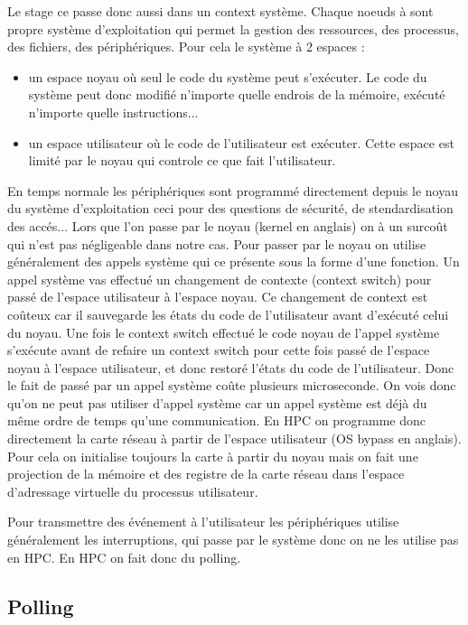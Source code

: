 Le stage ce passe donc aussi dans un context système.
Chaque noeuds à sont propre système d'exploitation qui permet la gestion des ressources, des processus, des fichiers, des périphériques.
Pour cela le système à 2 espaces :
\begin{itemize}
  \item un espace noyau où seul le code du système peut s'exécuter. Le code du système peut donc modifié n'importe quelle endrois de la mémoire, exécuté n'importe quelle instructions...
  \item un espace utilisateur où le code de l'utilisateur est exécuter. Cette espace est limité par le noyau qui controle ce que fait l'utilisateur.
\end{itemize}

En temps normale les périphériques sont programmé directement depuis le noyau du système d'exploitation ceci pour des questions de sécurité, de stendardisation des accés...
Lors que l'on passe par le noyau (kernel en anglais) on à un surcoût qui n'est pas négligeable dans notre cas.
Pour passer par le noyau on utilise généralement des appels système qui ce présente sous la forme d'une fonction.
Un appel système vas effectué un changement de contexte (context switch) pour passé de l'espace utilisateur à l'espace noyau.
Ce changement de context est coûteux car il sauvegarde les états du code de l'utilisateur avant d'exécuté celui du noyau.
Une fois le context switch effectué le code noyau de l'appel système s'exécute avant de refaire un context switch pour cette fois passé de l'espace noyau à l'espace utilisateur, et donc restoré l'états du code de l'utilisateur.
Donc le fait de passé par un appel système coûte plusieurs microseconde.
On vois donc qu'on ne peut pas utiliser d'appel système car un appel système est déjà du même ordre de temps qu'une communication.
En HPC on programme donc directement la carte réseau à partir de l'espace utilisateur (OS bypass en anglais).
Pour cela on initialise toujours la carte à partir du noyau mais on fait une projection de la mémoire et des registre de la carte réseau dans l'espace d'adressage virtuelle du processus utilisateur.

Pour transmettre des événement à l'utilisateur les périphériques utilise généralement les interruptions, qui passe par le système donc on ne les utilise pas en HPC.
En HPC on fait donc du polling.

\subsection{Polling}

